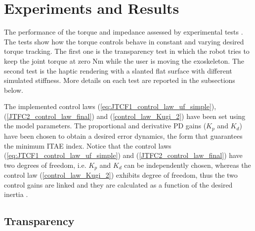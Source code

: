\section{Experiments and Results} \label{sec:experimentsResults}

The performance of the torque and impedance \DIFdelbegin {}\DIFdelend \DIFaddbegin {}\DIFaddend assessed by experimental tests  \DIFaddbegin {}  \DIFaddend . 
The tests show how the torque controls behave in constant and varying desired torque tracking.
The first one is the transparency test in which the robot tries to keep the joint torque at zero Nm while the user is moving the exoskeleton.
The second test is the haptic rendering with a slanted flat surface with different simulated stiffness.
More details on each test are reported in the subsections below.
\par The implemented control laws (\ref{eq:JTCF1_control_law_uf_simple}), (\ref{JTFC2_control_law_final}) and (\ref{control_law_Kugi_2}) have been set using the model parameters. The proportional and derivative PD gains ($K_p$ and $K_d$) have been chosen to obtain a desired error dynamics, \DIFdelbegin {}\DIFdelend \DIFaddbegin {}\DIFaddend the form that guarantees the minimum ITAE index. Notice that the control laws (\ref{eq:JTCF1_control_law_uf_simple}) and (\ref{JTFC2_control_law_final}) have two degrees of freedom, i.e. $K_p$ and $K_d$ can be independently chosen, whereas the control law (\ref{control_law_Kugi_2}) exhibits \DIFdelbegin {}\DIFdelend \DIFaddbegin {}\DIFaddend degree of freedom, thus the two control gains are linked and they are calculated as a function of the desired inertia \DIFdelbegin {}\DIFdelend \DIFaddbegin {}\DIFaddend .

\subsection{Transparency} \label{subsec:transparency}

